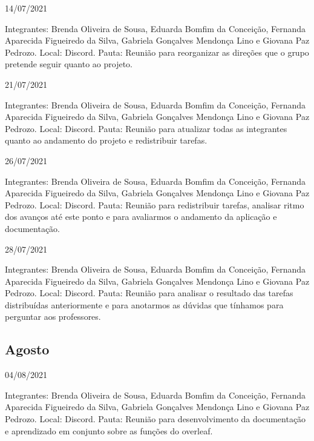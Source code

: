 \begin{apendicesenv}
\begin{flushleft}
14/07/2021 

Integrantes: Brenda Oliveira de Sousa, Eduarda Bomfim da Conceição, Fernanda Aparecida Figueiredo da Silva, Gabriela Gonçalves Mendonça Lino e Giovana Paz Pedrozo.
\newline
Local: \gls{Discord}.
\newline
Pauta: Reunião para reorganizar as direções que o grupo pretende seguir quanto ao projeto.

21/07/2021 

Integrantes: Brenda Oliveira de Sousa, Eduarda Bomfim da Conceição, Fernanda Aparecida Figueiredo da Silva, Gabriela Gonçalves Mendonça Lino e Giovana Paz Pedrozo.
\newline
Local: \gls{Discord}.
\newline
Pauta: Reunião para atualizar todas as integrantes quanto ao andamento do projeto e redistribuir tarefas.

26/07/2021 

Integrantes: Brenda Oliveira de Sousa, Eduarda Bomfim da Conceição, Fernanda Aparecida Figueiredo da Silva, Gabriela Gonçalves Mendonça Lino e Giovana Paz Pedrozo.
\newline
Local: \gls{Discord}.
\newline
Pauta: Reunião para redistribuir tarefas, analisar ritmo dos avanços até este ponto e para avaliarmos o andamento da aplicação e documentação.

28/07/2021 

Integrantes: Brenda Oliveira de Sousa, Eduarda Bomfim da Conceição, Fernanda Aparecida Figueiredo da Silva, Gabriela Gonçalves Mendonça Lino e Giovana Paz Pedrozo.
\newline
Local: \gls{Discord}.
\newline
Pauta: Reunião para analisar o resultado das tarefas distribuídas anteriormente e para anotarmos as dúvidas que tínhamos para perguntar aos professores.

\end{flushleft}

\begin{flushleft}
 \section{Agosto}
 04/08/2021 

Integrantes: Brenda Oliveira de Sousa, Eduarda Bomfim da Conceição, Fernanda Aparecida Figueiredo da Silva, Gabriela Gonçalves Mendonça Lino e Giovana Paz Pedrozo.
\newline
Local: \gls{Discord}.
\newline
Pauta: Reunião para desenvolvimento da documentação e aprendizado em conjunto sobre as funções do overleaf.


\end{flushleft}
\end{apendicesenv}
